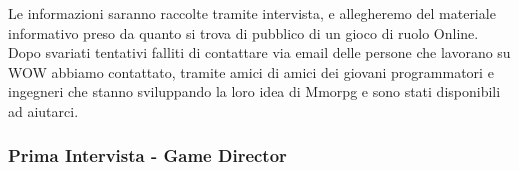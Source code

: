 
Le informazioni saranno raccolte tramite intervista, e allegheremo del materiale informativo preso da quanto si trova di pubblico di un gioco di ruolo Online.\\
Dopo svariati tentativi falliti di contattare via email delle persone che lavorano su WOW abbiamo contattato, 
tramite amici di amici dei giovani programmatori e ingegneri che stanno sviluppando la loro idea di Mmorpg e sono stati disponibili ad aiutarci.


\subsubsection{Prima Intervista - Game Director} %

\medskip


